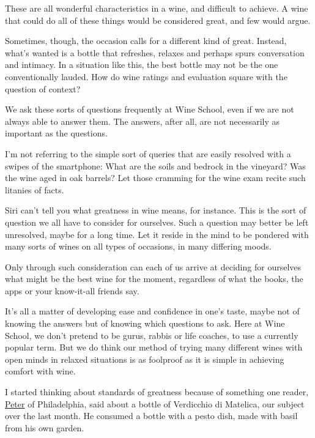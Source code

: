 These are all wonderful characteristics in a wine, and difficult to
achieve. A wine that could do all of these things would be considered
great, and few would argue.

Sometimes, though, the occasion calls for a different kind of great.
Instead, what's wanted is a bottle that refreshes, relaxes and perhaps
spurs conversation and intimacy. In a situation like this, the best
bottle may not be the one conventionally lauded. How do wine ratings and
evaluation square with the question of context?

We ask these sorts of questions frequently at Wine School, even if we
are not always able to answer them. The answers, after all, are not
necessarily as important as the questions.

I'm not referring to the simple sort of queries that are easily resolved
with a swipes of the smartphone: What are the soils and bedrock in the
vineyard? Was the wine aged in oak barrels? Let those cramming for the
wine exam recite such litanies of facts.

Siri can't tell you what greatness in wine means, for instance. This is
the sort of question we all have to consider for ourselves. Such a
question may better be left unresolved, maybe for a long time. Let it
reside in the mind to be pondered with many sorts of wines on all types
of occasions, in many differing moods.

Only through such consideration can each of us arrive at deciding for
ourselves what might be the best wine for the moment, regardless of what
the books, the apps or your know-it-all friends say.

It's all a matter of developing ease and confidence in one's taste,
maybe not of knowing the answers but of knowing which questions to ask.
Here at Wine School, we don't pretend to be gurus, rabbis or life
coaches, to use a currently popular term. But we do think our method of
trying many different wines with open minds in relaxed situations is as
foolproof as it is simple in achieving comfort with wine.

I started thinking about standards of greatness because of something one
reader,
\href{https://www.nytimes3xbfgragh.onion/2020/07/02/dining/drinks/wine-school-assignment-verdicchio-di-matelica.html\#commentsContainer\&permid=108235588}{Peter}
of Philadelphia, said about a bottle of Verdicchio di Matelica, our
subject over the last month. He consumed a bottle with a pesto dish,
made with basil from his own garden.

